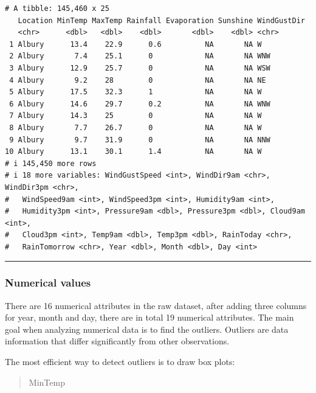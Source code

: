 \documentclass[
  letterpaper,
  DIV=11,
  numbers=noendperiod]{scrartcl}
\newenvironment{Shaded}{\begin{snugshade}}{\end{snugshade}}
\newcommand{\AttributeTok}[1]{\textcolor[rgb]{0.40,0.45,0.13}{#1}}
\newcommand{\FunctionTok}[1]{\textcolor[rgb]{0.28,0.35,0.67}{#1}}
\newcommand{\NormalTok}[1]{\textcolor[rgb]{0.00,0.23,0.31}{#1}}
\newcommand{\SpecialCharTok}[1]{\textcolor[rgb]{0.37,0.37,0.37}{#1}}
\newcommand{\StringTok}[1]{\textcolor[rgb]{0.13,0.47,0.30}{#1}}
\begin{document}
\begin{verbatim}
# A tibble: 145,460 x 25
   Location MinTemp MaxTemp Rainfall Evaporation Sunshine WindGustDir
   <chr>      <dbl>   <dbl>    <dbl>       <dbl>    <dbl> <chr>      
 1 Albury      13.4    22.9      0.6          NA       NA W          
 2 Albury       7.4    25.1      0            NA       NA WNW        
 3 Albury      12.9    25.7      0            NA       NA WSW        
 4 Albury       9.2    28        0            NA       NA NE         
 5 Albury      17.5    32.3      1            NA       NA W          
 6 Albury      14.6    29.7      0.2          NA       NA WNW        
 7 Albury      14.3    25        0            NA       NA W          
 8 Albury       7.7    26.7      0            NA       NA W          
 9 Albury       9.7    31.9      0            NA       NA NNW        
10 Albury      13.1    30.1      1.4          NA       NA W          
# i 145,450 more rows
# i 18 more variables: WindGustSpeed <int>, WindDir9am <chr>, WindDir3pm <chr>,
#   WindSpeed9am <int>, WindSpeed3pm <int>, Humidity9am <int>,
#   Humidity3pm <int>, Pressure9am <dbl>, Pressure3pm <dbl>, Cloud9am <int>,
#   Cloud3pm <int>, Temp9am <dbl>, Temp3pm <dbl>, RainToday <chr>,
#   RainTomorrow <chr>, Year <dbl>, Month <dbl>, Day <int>
\end{verbatim}

\begin{center}\rule{0.5\linewidth}{0.5pt}\end{center}

\hypertarget{numerical-values}{%
\subsubsection{Numerical values}\label{numerical-values}}

There are 16 numerical attributes in the raw dataset, after adding three
columns for year, month and day, there are in total 19 numerical
attributes. The main goal when analyzing numerical data is to find the
outliers. Outliers are data information that differ significantly from
other observations.

The most efficient way to detect outliers is to draw box plots:

\begin{quote}
MinTemp
\end{quote}

\begin{Shaded}
\end{Shaded}
\end{document}
